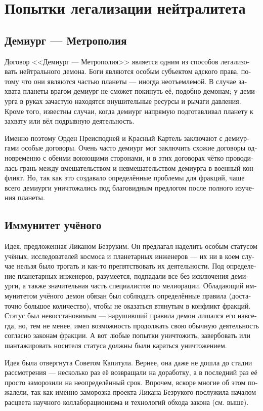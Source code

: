 \documentclass[a4paper,12pt,fleqn]{book}\usepackage{polyglossia}\setdefaultlanguage[babelshorthands=true]{russian}\setotherlanguage{english}\defaultfontfeatures{Ligatures=TeX,Mapping=tex-text}\usepackage{xcolor}\newcommand{\ml}[3]{#2}
\begin{document}
{\section{Попытки легализации нейтралитета}

\subsection{Демиург --- Метрополия}

Договор <<Демиург --- Метрополия>> является одним из способов легализовать нейтрального демона.
Боги являются особым субъектом адского права, потому что они являются частью планеты --- иногда неотъемлемой.
В случае захвата планеты врагом демиург не сможет покинуть её, подобно демонам;
у демиурга в руках зачастую находятся внушительные ресурсы и рычаги давления.
Кроме того, известны случаи, когда демиург напрямую подготавливал планету к захвату или вёл подрывную деятельность.

Именно поэтому Орден Преисподней и Красный Картель заключают с демиургами особые договоры.
Очень часто демиург мог заключить схожие договоры одновременно с обеими воюющими сторонами, и в этих договорах чётко проводилась грань между вмешательством и невмешательством демиурга в военный конфликт.
Но, так как это создавало определённые проблемы для фракций, чаще всего демиурги уничтожались под благовидным предлогом после полного изучения планеты.

\subsection{Иммунитет учёного}

Идея, предложенная Ликаном Безруким.
Он предлагал наделить особым статусом учёных, исследователей космоса и планетарных инженеров --- их ни в коем случае нельзя было трогать и как-то препятствовать их деятельности.
Под определение планетарных инженеров, разумеется, подпадали все без исключения демиурги, а также значительная часть специалистов по мелиорации.
Обладающий иммунитетом учёного демон обязан был соблюдать определённые правила (достаточно большое количество), чтобы не оказаться втянутым в конфликт фракций.
Статус был невосстановимым --- нарушивший правила демон лишался его навсегда, но, тем не менее, имел возможность продолжать свою обычную деятельность согласно законам фракции.
А вот любые попытки уничтожить, завербовать или шантажировать носителя статуса должны были караться уничтожением.

Идея была отвергнута Советом Капитула.
Вернее, она даже не дошла до стадии рассмотрения --- несколько раз её возвращали на доработку, а в последний раз её просто заморозили на неопределённый срок.
Впрочем, вскоре многие об этом пожалели, так как именно заморозка проекта Ликана Безрукого послужила началом расцвета научного коллаборационизма и технологий обхода закона (см. выше).

}
\end{document}
